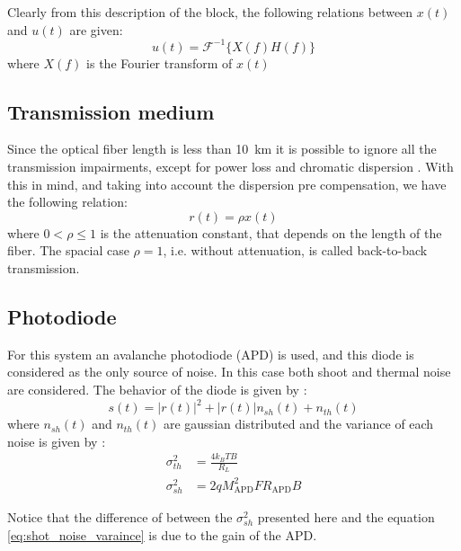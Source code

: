Clearly from this description of the block, the following relations between $x(t)$ and $u(t)$ are given:
\begin{equation}
	u(t)=\mathcal{F}^{-1}\bigl\{X(f)H(f)\bigr\}
	\label{eq:Tuey_Disp_precomp}
\end{equation}
where $X(f)$ is the Fourier transform of $x(t)$


\subsection{Transmission medium}

Since the optical fiber length is less than \SI{10}{\km} it is possible to ignore all the transmission impairments, except for power loss and chromatic dispersion \cite{Tasbihi_Tukey}. With this in mind, and taking into account the dispersion pre compensation, we have the following relation:
\begin{equation}
r(t)=\rho x(t)
\label{eq:Tukey_fiber_out}
\end{equation}
 where $0<\rho\leq1$ is the attenuation constant, that depends on the length of the fiber. The spacial case $\rho=1$, i.e. without attenuation, is called back-to-back transmission.

\subsection{Photodiode}

For this system an avalanche photodiode (APD) is used, and this diode is considered as the only source of noise. In this case both shoot and thermal noise are considered. The behavior of  the diode is given by \cite{Tasbihi_Tukey}:
\begin{equation}
s(t)=\bigl|r(t)\bigr|^2+\bigl|r(t)\bigr|n_{sh}(t)+n_{th}(t)
\label{eq:Tukey_PD}
\end{equation}
where $n_{sh}(t)$ and $n_{th}(t)$ are gaussian distributed and the variance of each noise is given by \cite{Tasbihi_Tukey}:
\begin{align}
	\sigma^2_{th}&=\frac{4k_BTB}{R_L}\\
	\sigma^2_{sh}&=2qM^2_{\text{APD}}FR_\text{APD}B
\end{align}

Notice that the difference of between the $\sigma^2_{sh}$ presented here and the equation \ref{eq:shot_noise_varaince} is due to the gain of the APD.

